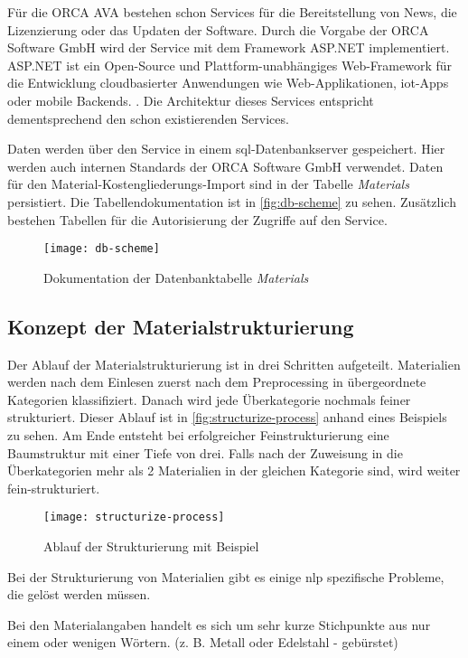 Für die ORCA AVA bestehen schon Services für die Bereitstellung von News, die Lizenzierung oder das Updaten der Software. Durch die Vorgabe der ORCA Software GmbH wird der Service mit dem Framework ASP.NET implementiert. ASP.NET ist ein Open-Source und Plattform-unabhängiges Web-Framework für die Entwicklung cloudbasierter Anwendungen wie Web-Applikationen, \ac{iot}-Apps oder mobile Backends. \citep[vgl.][]{asp-net}. Die Architektur dieses Services entspricht dementsprechend den schon existierenden Services.

Daten werden über den Service in einem \ac{sql}-Datenbankserver gespeichert. Hier werden auch internen Standards der ORCA Software GmbH verwendet. Daten für den Material-Kostengliederungs-Import sind in der Tabelle \textit{Materials} persistiert. Die Tabellendokumentation ist in \autoref{fig:db-scheme} zu sehen. Zusätzlich bestehen Tabellen für die Autorisierung der Zugriffe auf den Service.

\begin{figure}[h]
	\centering
	\texttt{[image: db-scheme]}
	\caption{Dokumentation der Datenbanktabelle \textit{Materials}}
	\label{fig:db-scheme}
\end{figure}

\subsection{Konzept der Materialstrukturierung}
\label{c:conception:architecture:structuring}
Der Ablauf der Materialstrukturierung ist in drei Schritten aufgeteilt. Materialien werden nach dem Einlesen zuerst nach dem Preprocessing in übergeordnete Kategorien klassifiziert. Danach wird jede Überkategorie nochmals feiner strukturiert.
Dieser Ablauf ist in \autoref{fig:structurize-process} anhand eines Beispiels zu sehen. Am Ende entsteht bei erfolgreicher Feinstrukturierung eine Baumstruktur mit einer Tiefe von drei. Falls nach der Zuweisung in die Überkategorien mehr als 2 Materialien in der gleichen Kategorie sind, wird weiter fein-strukturiert.

\begin{figure}[h]
	\centering
	\texttt{[image: structurize-process]}
	\caption{Ablauf der Strukturierung mit Beispiel}
	\label{fig:structurize-process}
\end{figure}

Bei der Strukturierung von Materialien gibt es einige \ac{nlp} spezifische Probleme, die gelöst werden müssen. 
\begin{problem}
	\label{p:shorttext}
	Bei den Materialangaben handelt es sich um sehr kurze Stichpunkte aus nur einem oder wenigen Wörtern. (z. B. \glqq Metall\grqq{} oder \glqq Edelstahl - gebürstet\grqq{})
\end{problem}

